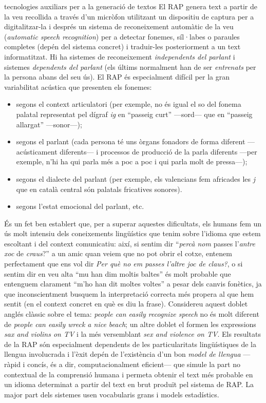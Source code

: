 \begin{persabermes}{tecnologies auxiliars per a la generació de textos}
  El RAP genera text a partir de la veu recollida a través d'un
  micròfon utilitzant un dispositiu de captura per a digitalitzar-la
  i després un sistema de reconeixement automàtic de la veu
  (\emph{automatic speech recognition}) per a detectar fonemes,
  síl·labes o paraules completes (depén del sistema concret) i
  traduir-les posteriorment a un text informatitzat.  Hi ha sistemes
  de reconeixement {\em independents del parlant} i sistemes
  \emph{dependents del parlant} (els últims normalment han de ser
  \emph{entrenats} per la persona abans del seu ús).  El RAP és
  especialment difícil per la gran variabilitat acústica que presenten
  els fonemes:
  \begin{itemize}
  \item segons el context articulatori (per exemple, no és igual el so
    del fonema palatal representat pel dígraf \emph{ig} en ``passeig
    curt'' ---sord--- que en ``passeig allargat'' ---sonor---);
  \item segons el parlant (cada persona té uns òrgans fonadors de
    forma diferent ---acústicament diferents--- i processos de
    producció de la parla diferents ---per exemple, n'hi ha qui parla
    més a poc a poc i qui parla molt de pressa---);
  \item segons el dialecte del parlant (per exemple, els valencians
    fem africades les \emph{j} que en català central són palatals
    fricatives sonores).
  \item segons l'estat emocional del parlant, etc.
  \end{itemize}
  És un fet ben establert que, per a superar aquestes dificultats, els
  humans fem un ús molt intensiu dels coneixements lingüístics que
  tenim sobre l'idioma que estem escoltant i del context comunicatiu:
  així, si sentim dir ``\emph{percà nom} passes l'\emph{antre xoc} de
  \emph{craus}?'' a un amic quan veiem que no pot obrir el cotxe,
  entenem perfectament que ens vol dir \emph{Per què no em
      passes l'altre joc de claus?}, o si sentim dir en veu alta ``mu
  han dim moltis baltes'' és molt probable que entenguem clarament
  ``m'ho han dit moltes voltes'' a pesar dels canvis fonètics, ja que
  inconscientment busquem la interpretació correcta més propera al que
  hem sentit (en el context concret en què es diu la
  frase). Considereu aquest doblet anglés clàssic sobre el
    tema: \emph{people can easily recognize speech} no és molt
    diferent de {\em people can easily wreck a nice beach}; un altre
    doblet el formen les expressions \emph{sax and violins on TV} i la
    més versemblant \emph{sex and violence on TV}. Els resultats de
  la RAP són especialment dependents de les particularitats
  lingüístiques de la llengua involucrada i l'èxit depén de
  l'existència d'un bon \emph{model de llengua} ---ràpid i concís, és
  a dir, computacionalment eficient--- que simule la part no
  contextual de la comprensió humana i permeta obtenir el text més
  probable en un idioma determinat a partir del text en brut produït
  pel sistema de RAP. La major part dels sistemes usen vocabularis
  grans i models estadístics.


\end{persabermes}
